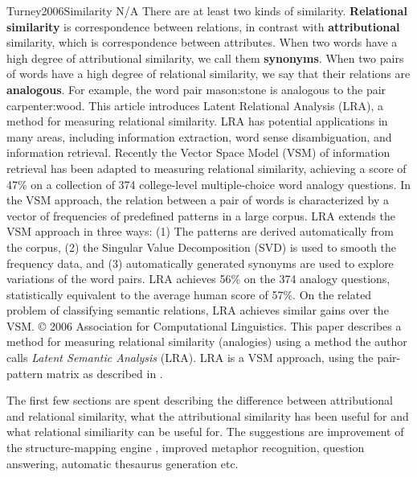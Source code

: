 \begin{review}
        {Turney2006Similarity}
        {N/A}
        {
        There are at least two kinds of similarity. 
        \textbf{Relational similarity} is correspondence between relations, in contrast with \textbf{attributional} similarity, which is correspondence between attributes.
        When two words have a high degree of attributional similarity, we call them \textbf{synonyms}. 
        When two pairs of words have a high degree of relational similarity, we say that their relations are \textbf{analogous}. 
        For example, the word pair mason:stone is analogous to the pair carpenter:wood. 
        This article introduces Latent Relational Analysis (LRA), a method for measuring relational similarity. LRA has potential applications in many areas, including information extraction, word sense disambiguation, and information retrieval. 
        Recently the Vector Space Model (VSM) of information retrieval has been adapted to measuring relational similarity, achieving a score of 47\% on a collection of 374 college-level multiple-choice word analogy questions. 
        In the VSM approach, the relation between a pair of words is characterized by a vector of frequencies of predefined patterns in a large corpus. 
        LRA extends the VSM approach in three ways: (1) The patterns are derived automatically from the corpus, (2) the Singular Value Decomposition (SVD) is used to smooth the frequency data, and (3) automatically generated synonyms are used to explore variations of the word pairs. 
        LRA achieves 56\% on the 374 analogy questions, statistically equivalent to the average human score of 57\%. 
        On the related problem of classifying semantic relations, LRA achieves similar gains over the VSM. 
        © 2006 Association for Computational Linguistics.
        }
    This paper describes a method for measuring relational similarity (analogies) using a method the author calls \emph{Latent Semantic Analysis} (LRA).
    LRA is a VSM approach, using the pair-pattern matrix as described in \cite{Turney2010VsmOverview}.
    
    The first few sections are spent describing the difference between attributional and relational similarity, what the attributional similarity has been useful for and what relational similiarity can be useful for.
    The suggestions are improvement of the structure-mapping engine \cite{Gentner1983Structure}, improved metaphor recognition, question answering, automatic thesaurus generation etc.
    

\end{review}
